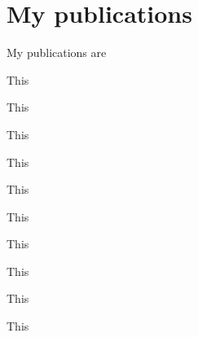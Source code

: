 \chapter{My publications}
My publications are

This
\cite{Cardoso2018}

This
\cite{Carvalho2018}

This
\cite{Ortiz2018}

This
\cite{Garcia-Martinez2017}

This
\cite{Lado2015}

This
\cite{Garcia-Martinez2015}

This
\cite{Garcia-Martinez2013}

This
\cite{Garcia-Martinez2013a}

This
\cite{Garcia-Martinez2019}

This
\cite{Ortiz2019}

